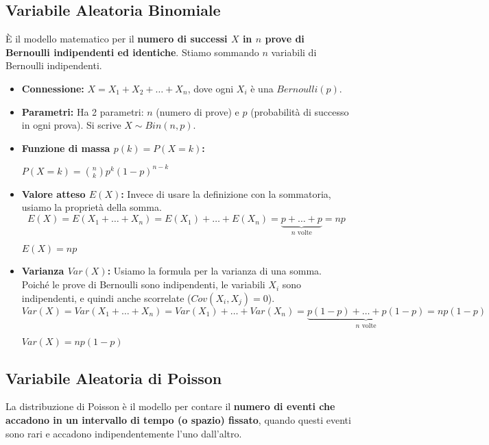 \documentclass[a4paper, 11pt]{article}
\theoremstyle{definition}
\begin{document}
\subsection{Variabile Aleatoria Binomiale}
È il modello matematico per il \textbf{numero di successi $X$ in $n$ prove di Bernoulli indipendenti ed identiche}. Stiamo sommando $n$ variabili di Bernoulli indipendenti.

\begin{itemize}
    \item \textbf{Connessione:} $X = X_1 + X_2 + \dots + X_n$, dove ogni $X_i$ è una $Bernoulli(p)$.

    \item \textbf{Parametri:} Ha 2 parametri: $n$ (numero di prove) e $p$ (probabilità di successo in ogni prova). Si scrive $X \sim Bin(n,p)$.

    \item \textbf{Funzione di massa $p(k) = P(X=k)$:}
    \begin{formulabox}
        $P(X=k) = \binom{n}{k} p^k (1-p)^{n-k}$
    \end{formulabox}

    \item \textbf{Valore atteso $E(X)$:} Invece di usare la definizione con la sommatoria, usiamo la proprietà della somma.
    \[ E(X) = E(X_1 + \dots + X_n) = E(X_1) + \dots + E(X_n) = \underbrace{p + \dots + p}_{n \text{ volte}} = np \]
    \begin{formulabox}
        $E(X) = np$
    \end{formulabox}

    \item \textbf{Varianza $Var(X)$:} Usiamo la formula per la varianza di una somma. Poiché le prove di Bernoulli sono indipendenti, le variabili $X_i$ sono indipendenti, e quindi anche scorrelate ($Cov(X_i, X_j)=0$).
    \[ Var(X) = Var(X_1 + \dots + X_n) = Var(X_1) + \dots + Var(X_n) = \underbrace{p(1-p) + \dots + p(1-p)}_{n \text{ volte}} = np(1-p) \]
    \begin{formulabox}
        $Var(X) = np(1-p)$
    \end{formulabox}
\end{itemize}

\subsection{Variabile Aleatoria di Poisson}
La distribuzione di Poisson è il modello per contare il \textbf{numero di eventi che accadono in un intervallo di tempo (o spazio) fissato}, quando questi eventi sono rari e accadono indipendentemente l'uno dall'altro.
\end{document}
